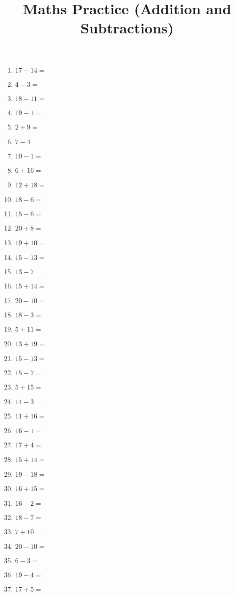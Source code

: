 \documentclass[11pt]{article}\usepackage[a4paper,margin=0.90in,tmargin=0.5in]{geometry}\usepackage{amsmath, amsthm, amssymb}
\title{Maths Practice (Addition and Subtractions)}
\begin{document}
\maketitle
\addstretch{\baselineskip}
\addstretch{\abovedisplayskip}
\addstretch{\abovedisplayshortskip}
\addstretch{\belowdisplayskip}
\addstretch{\belowdisplayshortskip}
\addstretch{\itemsep}\begin{multicols}{4}
\begin{enumerate}[itemsep=0.45\baselineskip]
\item $17 - 14 =$ 
\item $4 - 3 =$ 
\item $18 - 11 =$ 
\item $19 - 1 =$ 
\item $2 + 9 =$ 
\item $7 - 4 =$ 
\item $10 - 1 =$ 
\item $6 + 16 =$ 
\item $12 + 18 =$ 
\item $18 - 6 =$ 
\item $15 - 6 =$ 
\item $20 + 8 =$ 
\item $19 + 10 =$ 
\item $15 - 13 =$ 
\item $13 - 7 =$ 
\item $15 + 14 =$ 
\item $20 - 10 =$ 
\item $18 - 3 =$ 
\item $5 + 11 =$ 
\item $13 + 19 =$ 
\item $15 - 13 =$ 
\item $15 - 7 =$ 
\item $5 + 15 =$ 
\item $14 - 3 =$ 
\item $11 + 16 =$ 
\item $16 - 1 =$ 
\item $17 + 4 =$ 
\item $15 + 14 =$ 
\item $19 - 18 =$ 
\item $16 + 15 =$ 
\item $16 - 2 =$ 
\item $18 - 7 =$ 
\item $7 + 10 =$ 
\item $20 - 10 =$ 
\item $6 - 3 =$ 
\item $19 - 4 =$ 
\item $17 + 5 =$ 

\end{enumerate}
\end{multicols}
\end{document}
